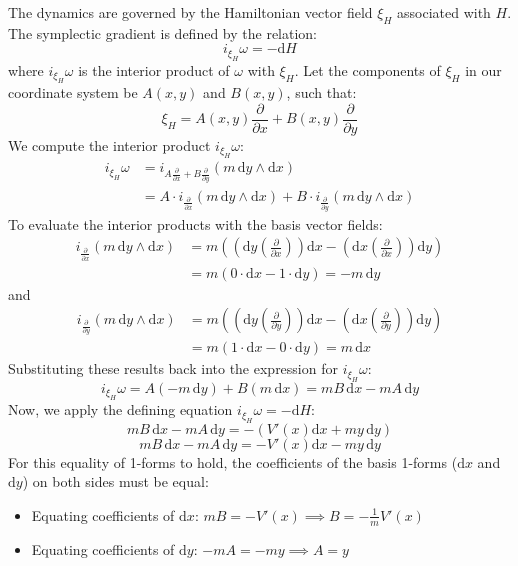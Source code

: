 The dynamics are governed by the Hamiltonian vector field $\xi_H$ associated with $H$. The symplectic gradient is defined by the relation:
\[ i_{\xi_H}\omega = -\mathrm{d}H \]
where $i_{\xi_H}\omega$ is the interior product of $\omega$ with $\xi_H$. Let the components of $\xi_H$ in our coordinate system be $A(x,y)$ and $B(x,y)$, such that:
\[ \xi_H = A(x,y) \frac{\partial}{\partial x} + B(x,y) \frac{\partial}{\partial y} \]
We compute the interior product $i_{\xi_H}\omega$:
\begin{align*}
i_{\xi_H}\omega &= i_{A \frac{\partial}{\partial x} + B \frac{\partial}{\partial y}} (m \, \mathrm{d}y \wedge \mathrm{d}x) \\
&= A \cdot i_{\frac{\partial}{\partial x}} (m \, \mathrm{d}y \wedge \mathrm{d}x) + B \cdot i_{\frac{\partial}{\partial y}} (m \, \mathrm{d}y \wedge \mathrm{d}x)
\end{align*}
To evaluate the interior products with the basis vector fields:
\begin{align*}
i_{\frac{\partial}{\partial x}} (m \, \mathrm{d}y \wedge \mathrm{d}x) &= m \left( (\mathrm{d}y (\frac{\partial}{\partial x})) \mathrm{d}x - (\mathrm{d}x (\frac{\partial}{\partial x})) \mathrm{d}y \right) \\
&= m \left( 0 \cdot \mathrm{d}x - 1 \cdot \mathrm{d}y \right) = -m \, \mathrm{d}y
\end{align*}
and
\begin{align*}
i_{\frac{\partial}{\partial y}} (m \, \mathrm{d}y \wedge \mathrm{d}x) &= m \left( (\mathrm{d}y (\frac{\partial}{\partial y})) \mathrm{d}x - (\mathrm{d}x (\frac{\partial}{\partial y})) \mathrm{d}y \right) \\
&= m \left( 1 \cdot \mathrm{d}x - 0 \cdot \mathrm{d}y \right) = m \, \mathrm{d}x
\end{align*}
Substituting these results back into the expression for $i_{\xi_H}\omega$:
\[ i_{\xi_H}\omega = A(-m \, \mathrm{d}y) + B(m \, \mathrm{d}x) = mB \, \mathrm{d}x - mA \, \mathrm{d}y \]
Now, we apply the defining equation $i_{\xi_H}\omega = -\mathrm{d}H$:
\[ mB \, \mathrm{d}x - mA \, \mathrm{d}y = -(V'(x) \mathrm{d}x + my \, \mathrm{d}y) \]
\[ mB \, \mathrm{d}x - mA \, \mathrm{d}y = -V'(x) \mathrm{d}x - my \, \mathrm{d}y \]
For this equality of 1-forms to hold, the coefficients of the basis 1-forms ($\mathrm{d}x$ and $\mathrm{d}y$) on both sides must be equal:
\begin{itemize}
    \item Equating coefficients of $\mathrm{d}x$: \quad $mB = -V'(x) \implies B = -\frac{1}{m}V'(x)$
    \item Equating coefficients of $\mathrm{d}y$: \quad $-mA = -my \implies A = y$
\end{itemize}
